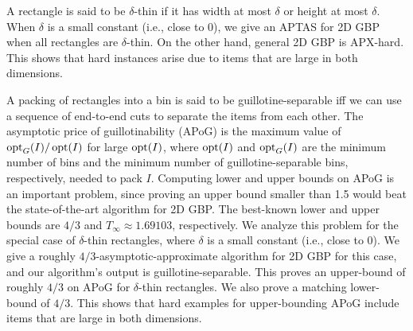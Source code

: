 A rectangle is said to be $\delta$-thin if it has
width at most $\delta$ or height at most $\delta$.
When $\delta$ is a small constant (i.e., close to 0), we give an APTAS for 2D GBP
when all rectangles are $\delta$-thin.
On the other hand, general 2D GBP is APX-hard.
This shows that hard instances arise due to items
that are large in both dimensions.

A packing of rectangles into a bin is said to be guillotine-separable iff
we can use a sequence of end-to-end cuts to separate the items from each other.
The asymptotic price of guillotinability (APoG) is the maximum
value of $\operatorname{opt}_G(I)/\operatorname{opt}(I)$ for large $\operatorname{opt}(I)$, where
$\operatorname{opt}(I)$ and $\operatorname{opt}_G(I)$ are the minimum number of bins and
the minimum number of guillotine-separable bins, respectively, needed to pack $I$.
Computing lower and upper bounds on APoG is an important problem,
since proving an upper bound smaller than 1.5 would beat
the state-of-the-art algorithm for 2D GBP.
The best-known lower and upper bounds are
$4/3$ and \texorpdfstring{$T_{\infty} \approx 1.69103$}{1.69104}, respectively.
We analyze this problem for the special case of $\delta$-thin rectangles,
where $\delta$ is a small constant (i.e., close to 0).
We give a roughly $4/3$-asymptotic-approximate algorithm for
2D GBP for this case, and our algorithm's output is guillotine-separable.
This proves an upper-bound of roughly $4/3$ on APoG for $\delta$-thin rectangles.
We also prove a matching lower-bound of $4/3$.
This shows that hard examples for upper-bounding APoG
include items that are large in both dimensions.
